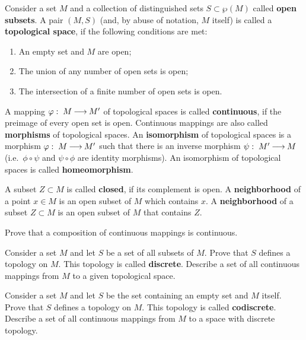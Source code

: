 \documentclass[12pt]{article}
\begin{document}



\begin{opredelenie}
  Consider a set $M$ and a collection of distinguished sets $S\subset
  \wp(M)$ called {\bf open subsets}. A pair $(M,S)$ (and, by abuse of
  notation, $M$ itself) is called a {\bf topological space}, if the
  following conditions are met:
\begin{enumerate}
\renewcommand{\labelenumi}{\arabic{enumi}.}
\item An empty set and $M$ are open;

\item The union of any number of open sets is open;

\item The intersection of a finite number of open sets is open.
\end{enumerate}
A mapping $\varphi:\; M {\:\longrightarrow\:} M'$ of topological spaces is called
 {\bf continuous}, if the preimage of every open set is
 open. Continuous mappings are also called {\bf morphisms} of
 topological spaces. An {\bf isomorphism} of topological spaces is a
 morphism $\varphi:\; M {\:\longrightarrow\:} M'$ such that there is an inverse morphism $\psi:\;
 M' {\:\longrightarrow\:} M$ (i.e.\ $\phi\circ \psi $ and $\psi\circ \phi $ are
 identity morphisms). An isomorphism of topological spaces is called
 {\bf homeomorphism}. 

 A subset $Z\subset M$ is called {\bf closed}, if its complement is
 open. A {\bf neighborhood } of a point $x\in M$ is an open subset of
 $M$ which contains $x$. A {\bf neighborhood} of a subset $Z\subset
 M$ is an open subset of $M$ that contains $Z$.
\end{opredelenie}

\begin{zadacha}
Prove that a composition of continuous mappings is continuous.
\end{zadacha}

\begin{zadacha}[!]
  Consider a set $M$ and let $S$ be a set of all subsets of $M$. Prove
  that $S$ defines a topology on $M$. This topology is called {\bf
    discrete}. Describe a set of all continuous mappings from $M$ to a
  given topological space.
\end{zadacha}

\begin{zadacha}[!]
  Consider a set $M$ and let $S$ be the set containing an empty set and
  $M$ itself. Prove that $S$ defines a topology on $M$. This topology
  is called {\bf codiscrete}. Describe a set of all continuous mappings
  from $M$ to a space with discrete topology.
\end{zadacha}
\end{document}

